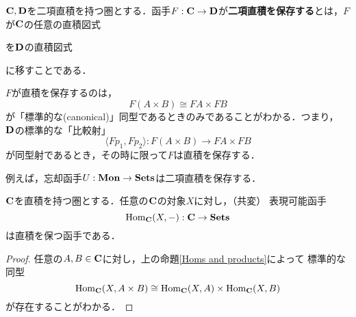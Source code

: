 \begin{definition}
 ${\bf C}, {\bf D}$を二項直積を持つ圏とする．函手$F: {\bf C} \to {\bf
 D}$が{\bfseries 二項直積を保存する}とは，$F$が${\bf C}$の任意の直積図式
 \begin{center}
 \end{center}
 を${\bf D}$の直積図式
  \begin{center}
 \end{center}
 に移すことである．
\end{definition}
$F$が直積を保存するのは，
\[
 F(A \times B) \cong FA \times FB
\]
が「標準的な(canonical)」同型であるときのみであることがわかる．つまり，
${\bf D}$の標準的な「比較射」
\[
 \langle Fp_1, Fp_2\rangle : F(A \times B) \to FA \times FB
\]
が同型射であるとき，その時に限って$F$は直積を保存する．

例えば，忘却函手$U: \mathbf{Mon} \to \mathbf{Sets}$は二項直積を保存する．

\begin{corollary}
 ${\bf C}$を直積を持つ圏とする．任意の${\bf C}$の対象$X$に対し，（共変）
 表現可能函手
 \[
  \mathrm{Hom}_{\bf C}(X, -): {\bf C} \to \mathbf{Sets}
 \]
 は直積を保つ函手である．
\end{corollary}
\begin{proof}
 任意の$A, B \in {\bf C}$に対し，上の命題\ref{Homs and products}によって
 標準的な同型
 \[
  \mathrm{Hom}_{\bf C}(X, A \times B)
   \cong \mathrm{Hom}_{\bf C}(X, A) \times \mathrm{Hom}_{\bf C}(X, B)
 \]
 が存在することがわかる．
\end{proof}
